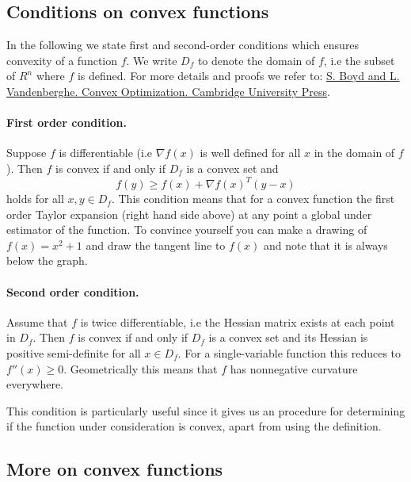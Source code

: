 \documentclass[%
oneside,                 %
final,                   %
10pt]{article}
\begin{document}
\subsection{Conditions on convex functions}

In the following we state first and second-order conditions which
ensures convexity of a function $f$. We write $D_f$ to denote the
domain of $f$, i.e the subset of $R^n$ where $f$ is defined. For more
details and proofs we refer to: \href{{http://stanford.edu/boyd/cvxbook/, 2004}}{S. Boyd and L. Vandenberghe. Convex Optimization. Cambridge University Press}.


\paragraph{First order condition.}
Suppose $f$ is differentiable (i.e $\nabla f(x)$ is well defined for
all $x$ in the domain of $f$). Then $f$ is convex if and only if $D_f$
is a convex set and $$f(y) \geq f(x) + \nabla f(x)^T (y-x) $$ holds
for all $x,y \in D_f$. This condition means that for a convex function
the first order Taylor expansion (right hand side above) at any point
a global under estimator of the function. To convince yourself you can
make a drawing of $f(x) = x^2+1$ and draw the tangent line to $f(x)$ and
note that it is always below the graph.




\paragraph{Second order condition.}
Assume that $f$ is twice
differentiable, i.e the Hessian matrix exists at each point in
$D_f$. Then $f$ is convex if and only if $D_f$ is a convex set and its
Hessian is positive semi-definite for all $x\in D_f$. For a
single-variable function this reduces to $f''(x) \geq 0$. Geometrically this means that $f$ has nonnegative curvature
everywhere.



This condition is particularly useful since it gives us an procedure for determining if the function under consideration is convex, apart from using the definition.

\subsection{More on convex functions}
\end{document}
